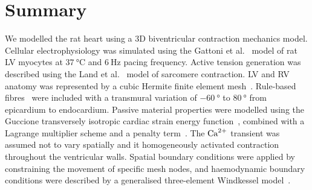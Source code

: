 %
%
%
\section{Summary}\label{sec:ch2summary}
We modelled the rat heart using a $3$D biventricular contraction mechanics model. Cellular electrophysiology was simulated using the Gattoni et al.~\cite{Gattoni:2016} model of rat LV myocytes at $\SI{37}{\celsius}$ and $\SI{6}{\hertz}$ pacing frequency. Active tension generation was described using the Land et al.~\cite{Land:2012*a} model of sarcomere contraction. LV and RV anatomy was represented by a cubic Hermite finite element mesh~\cite{Lamata:2011}. Rule-based fibres~\cite{Bayer:2012} were included with a transmural variation of $\SI{-60}{\degree}$ to $\SI{80}{\degree}$ from epicardium to endocardium. Passive material properties were modelled using the Guccione transversely isotropic cardiac strain energy function~\cite{Guccione:1991}, combined with a Lagrange multiplier scheme and a penalty term~\cite{Land:2012*a, Land:2015*b}. The $\textrm{Ca}^{2+}$ transient was assumed not to vary spatially and it homogeneously activated contraction throughout the ventricular walls. Spatial boundary conditions were applied by constraining the movement of specific mesh nodes, and haemodynamic boundary conditions were described by a generalised three-element Windkessel model~\cite{Westerhof:1991}.